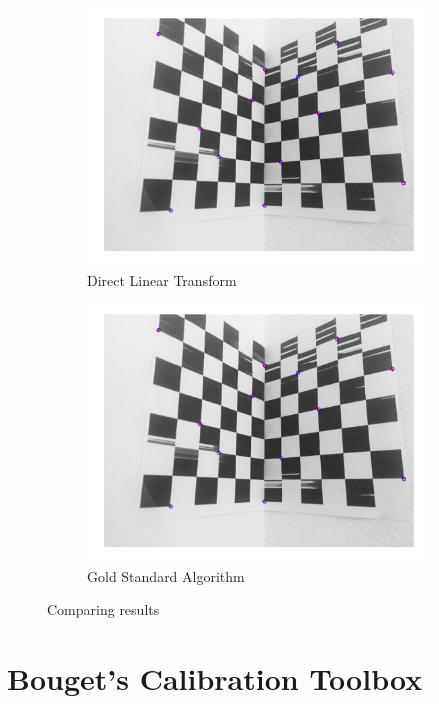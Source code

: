 \documentclass{ethz_report}
\begin{document}
\begin{figure}[H]
\centering
\begin{subfigure}[b]{.5\textwidth}
  \centering
  \includegraphics[width=1\linewidth]{images/DLT_reprojected}
  \caption{Direct Linear Transform}
\end{subfigure}%
\begin{subfigure}[b]{.5\textwidth}
  \centering
  \includegraphics[width=1\linewidth]{images/GoldStd_reprojected}
  \caption{Gold Standard Algorithm}
\end{subfigure}
\caption{Comparing results}
\label{fig:results_comparison}
\end{figure}

\section*{Bouget's Calibration Toolbox}
\end{document}
